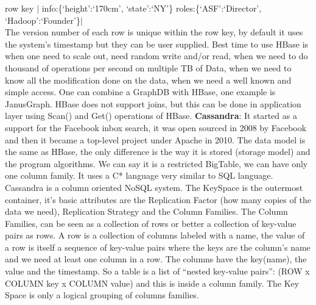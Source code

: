 \documentclass[a4page, 11pt]{article}
\begin{document}
row key $|$ info:\{`height':`170cm', `state':`NY'\}  roles:\{`ASF':`Director', `Hadoop':`Founder'\}$|$\\
The version number of each row is unique within the row key, by default it uses the system's timestamp but they can be user supplied.
\newline
Best time to use HBase is when one need to scale out, need random write and/or read, when we need to do thousand of operations per second on multiple TB of Data, when we need to know all the modification done on
the data, when we need a well known and simple access. One can combine a GraphDB with HBase, one example is JanusGraph.
HBase does not support joins, but this can be done in application layer using Scan() and Get() operations of HBase.
\newline
\newline
\textbf{Cassandra\cite{Facebook}}: It started as a support for the Facebook inbox search, it was open sourced in 2008 by Facebook and then it became a top-level project under Apache in 2010. The data model is the same as HBase, the only difference is the way it is stored (storage model) and the program algorithms. We can say it is a restricted BigTable, we can have only one column family. It uses a C* language very similar to SQL language.
\newline
Cassandra is a column oriented NoSQL system. 
The KeySpace is the outermost container, it's basic attributes are the Replication Factor (how many copies of the data we need), Replication Strategy and the Column Families.
The Column Families, can be seen as a collection of rows or better a collection of key-value pairs as rows. 
A row is a collection of columns labeled with a name, the value of a row is itself a sequence of key-value pairs where the keys are the column's name and we need at least one column in a row. The columns have the key(name), the value and the timestamp. So a table is a list of “nested key-value pairs”: (ROW x COLUMN key x COLUMN value) and this is inside a column family.
The Key Space is only a logical grouping of columns families.
\end{document}
